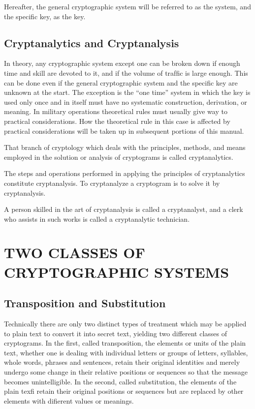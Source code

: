 \mypara Hereafter, the general cryptographic system will be referred to as
the system, and the speciﬁc key, as the key.

\subsection{Cryptanalytics and Cryptanalysis}

\mypara In theory, any cryptographic system except one can be broken down
if enough time and skill are devoted to it, and if the volume of trafﬁc is
large enough. This can be done even if the general cryptographic system
and the speciﬁc key are unknown at the start. The exception is the “one
time” system in which the key is used only once and in itself must have
no systematic construction, derivation, or meaning. In military operations
theoretical rules must usually give way to practical considerations. How
the theoretical rule in this case is affected by practical considerations
will be taken up in subsequent portions of this manual.

\mypara That branch of cryptology which deals with the principles, methods,
and means employed in the solution or analysis of cryptograms is called
cryptanalytics.

\mypara The steps and operations performed in applying the principles of
cryptanalytics constitute cryptanalysis. To cryptanalyze a cryptogram is
to solve it by cryptanalysis.

\mypara A person skilled in the art of cryptanalysis is called a cryptanalyst,
and a clerk who assists in such works is called a cryptanalytic technician.

\section{TWO CLASSES OF CRYPTOGRAPHIC SYSTEMS}

\subsection{Transposition and Substitution}

\mypara Technically there are only two distinct types of treatment which
may be applied to plain text to convert it into secret text, yielding two
different classes of cryptograms. In the ﬁrst, called transposition, the
elements or units of the plain text, whether one is dealing with individual
letters or groups of letters, syllables, whole words, phrases and sentences,
retain their original identities and merely undergo some change in their
relative positions or sequences so that the message becomes unintelligible.
In the second, called substitution, the elements of the plain texﬁ retain
their original positions or sequences but are replaced by other elements
with diﬁerent values or meanings.

